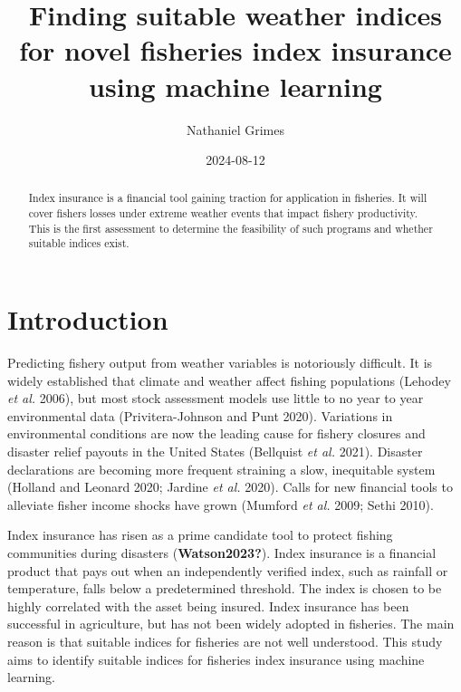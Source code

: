 \documentclass[
  letterpaper,
  DIV=11,
  numbers=noendperiod]{scrartcl}
\title{Finding suitable weather indices for novel fisheries index
insurance using machine learning}
\author{Nathaniel Grimes}
\date{2024-08-12}
\renewcommand*\contentsname{Table of contents}
\newcommand\contentsname{Table of contents}
\begin{document}
\maketitle
\begin{abstract}
Index insurance is a financial tool gaining traction for application in
fisheries. It will cover fishers losses under extreme weather events
that impact fishery productivity. This is the first assessment to
determine the feasibility of such programs and whether suitable indices
exist.
\end{abstract}
\ifdefined\Shaded\renewenvironment{Shaded}{\begin{tcolorbox}[boxrule=0pt, breakable, interior hidden, frame hidden, borderline west={3pt}{0pt}{shadecolor}, enhanced, sharp corners]}{\end{tcolorbox}}\fi

\renewcommand*\contentsname{Table of contents}
{
\hypersetup{linkcolor=}
\setcounter{tocdepth}{3}
\tableofcontents
}
\hypertarget{introduction}{%
\section{Introduction}\label{introduction}}

Predicting fishery output from weather variables is notoriously
difficult. It is widely established that climate and weather affect
fishing populations (Lehodey \emph{et al.} 2006), but most stock
assessment models use little to no year to year environmental data
(Privitera-Johnson and Punt 2020). Variations in environmental
conditions are now the leading cause for fishery closures and disaster
relief payouts in the United States (Bellquist \emph{et al.} 2021).
Disaster declarations are becoming more frequent straining a slow,
inequitable system (Holland and Leonard 2020; Jardine \emph{et al.}
2020). Calls for new financial tools to alleviate fisher income shocks
have grown (Mumford \emph{et al.} 2009; Sethi 2010).

Index insurance has risen as a prime candidate tool to protect fishing
communities during disasters (\textbf{Watson2023?}). Index insurance is
a financial product that pays out when an independently verified index,
such as rainfall or temperature, falls below a predetermined threshold.
The index is chosen to be highly correlated with the asset being
insured. Index insurance has been successful in agriculture, but has not
been widely adopted in fisheries. The main reason is that suitable
indices for fisheries are not well understood. This study aims to
identify suitable indices for fisheries index insurance using machine
learning.
\end{document}
